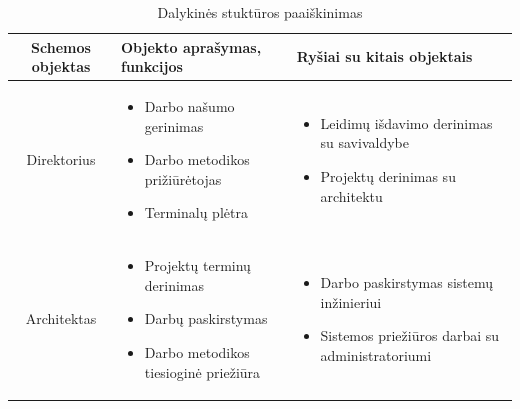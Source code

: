 \documentclass[10pt]{IEEEtran}
\begin{document}
            \begin{table}[t]
                \centering
                \renewcommand{\arraystretch}{1.3}
                \caption{Dalykinės stuktūros paaiškinimas}
                \label{table:struktura}
                \begin{tabular}{|c|p{5cm}|p{5cm}|} \hline 
                    \textbf{Schemos objektas} & \textbf{Objekto aprašymas, funkcijos} & \textbf{Ryšiai su kitais objektais} \\ \hline

                    Direktorius & 
                    \begin{itemize} 
                        \item Darbo našumo gerinimas 
                        \item Darbo metodikos prižiūrėtojas 
                        \item Terminalų plėtra
                    \end{itemize} & 
                    \begin{itemize}
                        \item Leidimų išdavimo derinimas su savivaldybe 
                        \item Projektų derinimas su architektu 
                    \end{itemize}\\ \hline

                    Architektas & 
                    \begin{itemize}
                        \item Projektų terminų derinimas
                        \item Darbų paskirstymas
                        \item Darbo metodikos tiesioginė priežiūra 
                    \end{itemize} & 
                    \begin{itemize}
                        \item Darbo paskirstymas sistemų inžinieriui
                        \item Sistemos priežiūros darbai su administratoriumi
                    \end{itemize} \\ \hline


\end{tabular}
\end{table}
\end{document}
